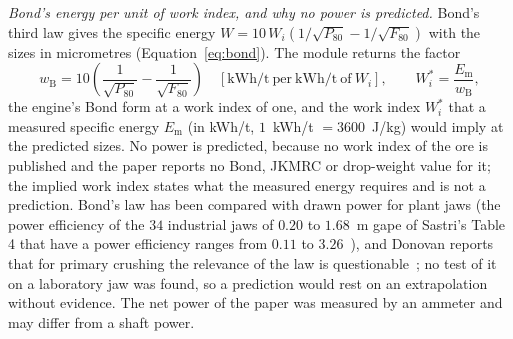 \emph{Bond's energy per unit of work index, and why no power is predicted.} Bond's third law gives the specific energy $W=10\,W_i\left(1/\sqrt{P_{80}}-1/\sqrt{F_{80}}\right)$ with the sizes in micrometres (Equation~\eqref{eq:bond}). The module returns the factor
\begin{equation}
w_{\mathrm B}=10\left(\frac{1}{\sqrt{P_{80}}}-\frac{1}{\sqrt{F_{80}}}\right)\quad[\mathrm{kWh/t\ per\ kWh/t\ of}\ W_i],\qquad W_i^{\ast}=\frac{E_{\mathrm m}}{w_{\mathrm B}},
\label{eq:labjaw-bond}
\end{equation}
the engine's Bond form at a work index of one, and the work index $W_i^{\ast}$ that a measured specific energy $E_{\mathrm m}$ (in kWh/t, $1$~kWh/t $=3600$~J/kg) would imply at the predicted sizes. No power is predicted, because no work index of the ore is published and the paper reports no Bond, JKMRC or drop-weight value for it; the implied work index states what the measured energy requires and is not a prediction. Bond's law has been compared with drawn power for plant jaws (the power efficiency of
the $34$ industrial jaws of $0.20$ to $1.68$~m gape of Sastri's Table 4 that have a power efficiency ranges from $0.11$ to $3.26$~\cite{sastri1994}), and Donovan reports that for primary crushing the relevance of the law is questionable~\cite{donovan2003}; no test of it on a laboratory jaw was found, so a prediction would rest on an extrapolation without evidence. The net power of the paper was measured by an ammeter and may differ from a shaft power.

